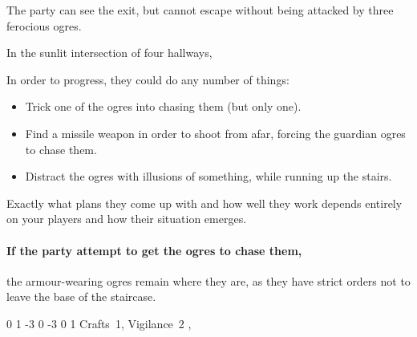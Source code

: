\begin{multicols}{2}

The party can see the exit, but cannot escape without being attacked by three ferocious ogres.

\begin{boxtext}

  In the sunlit intersection of four hallways,
  \iftoggle{hardcore}%
    {four ogres sit playing a game of dice.  Two are clad in black leather armour, with a massive sword by their side.
    Another sucks on a horse's uncooked head, while the third goes for a piss behind the staircase.}%
    {three ogres sit playing dice.
    Two are clad in black, leather armour, apparently pieced together from multiple suits.
    The third sits watching them play some dice game.}%

\end{boxtext}

In order to progress, they could do any number of things:

\begin{itemize}

  \item{Trick one of the ogres into chasing them (but only one).}
  \item{Find a missile weapon in order to shoot from afar, forcing the guardian ogres to chase them.}
  \item{Distract the ogres with illusions of something, while running up the stairs.}

\end{itemize}

Exactly what plans they come up with and how well they work depends entirely on your players and how their situation emerges.

\paragraph{If the party attempt to get the ogres to chase them,}
the armour-wearing ogres remain where they are, as they have strict orders not to leave the base of the staircase.


{0}%
{1}%
{{-3}%
{0}%
{-3}}%
{0}%
{1}%
{Crafts~1, Vigilance~2}%
{\greatsword, \partialleather}%
{}


\label{chasingogre}


\end{multicols}

